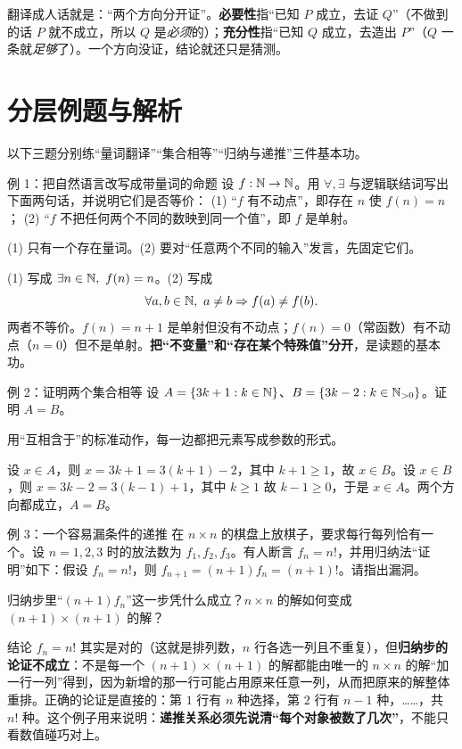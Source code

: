 \begin{tip}
翻译成人话就是：“两个方向分开证”。\textbf{必要性}指“已知 $P$ 成立，去证 $Q$”（不做到的话 $P$ 就不成立，所以 $Q$ 是\emph{必须}的）；\textbf{充分性}指“已知 $Q$ 成立，去造出 $P$”（$Q$ 一条就\emph{足够}了）。一个方向没证，结论就还只是猜测。
\end{tip}

\section{分层例题与解析}
以下三题分别练“量词翻译”“集合相等”“归纳与递推”三件基本功。

\begin{problem}{例 1：把自然语言改写成带量词的命题}
设 $f:\mathbb N\to\mathbb N$。用 $\forall,\exists$ 与逻辑联结词写出下面两句话，并说明它们是否等价：
(1) “$f$ 有不动点”，即存在 $n$ 使 $f(n)=n$；
(2) “$f$ 不把任何两个不同的数映到同一个值”，即 $f$ 是单射。
\end{problem}
\hint (1) 只有一个存在量词。(2) 要对“任意两个不同的输入”发言，先固定它们。

\sol (1) 写成 $\exists n\in\N,\ f(n)=n$。(2) 写成
\[
\forall a,b\in\N,\ a\ne b\Rightarrow f(a)\ne f(b).
\]
两者不等价。$f(n)=n+1$ 是单射但没有不动点；$f(n)=0$（常函数）有不动点（$n=0$）但不是单射。\textbf{把“不变量”和“存在某个特殊值”分开}，是读题的基本功。

\begin{problem}{例 2：证明两个集合相等}
设 $A=\{3k+1:k\in\mathbb N\}$、$B=\{3k-2:k\in\mathbb N_{>0}\}$。证明 $A=B$。
\end{problem}
\hint 用“互相含于”的标准动作，每一边都把元素写成参数的形式。

\sol 设 $x\in A$，则 $x=3k+1=3(k+1)-2$，其中 $k+1\ge1$，故 $x\in B$。设 $x\in B$，则 $x=3k-2=3(k-1)+1$，其中 $k\ge1$ 故 $k-1\ge0$，于是 $x\in A$。两个方向都成立，$A=B$。

\begin{problem}{例 3：一个容易漏条件的递推}
在 $n\times n$ 的棋盘上放棋子，要求每行每列恰有一个。设 $n=1,2,3$ 时的放法数为 $f_1,f_2,f_3$。有人断言 $f_n=n!$，并用归纳法“证明”如下：假设 $f_n=n!$，则 $f_{n+1}=(n+1)f_n=(n+1)!$。请指出漏洞。
\end{problem}
\hint 归纳步里“$(n+1)f_n$”这一步凭什么成立？$n\times n$ 的解如何变成 $(n+1)\times(n+1)$ 的解？

\sol 结论 $f_n=n!$ 其实是对的（这就是排列数，$n$ 行各选一列且不重复），但\textbf{归纳步的论证不成立}：不是每一个 $(n+1)\times(n+1)$ 的解都能由唯一的 $n\times n$ 的解“加一行一列”得到，因为新增的那一行可能占用原来任意一列，从而把原来的解整体重排。正确的论证是直接的：第 $1$ 行有 $n$ 种选择，第 $2$ 行有 $n-1$ 种，……，共 $n!$ 种。这个例子用来说明：\textbf{递推关系必须先说清“每个对象被数了几次”}，不能只看数值碰巧对上。

